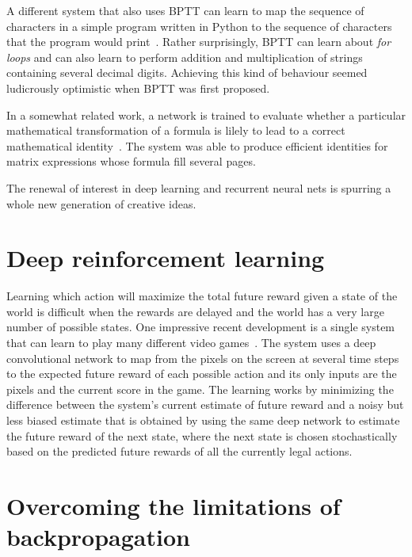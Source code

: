 \documentclass[10pts]{article}
\begin{document}
A different system that also uses BPTT can learn to map the sequence
of characters in a simple program written in Python to the sequence of
characters that the program would
print~\citep{Zaremba+Sutskever-arxiv2014}.  Rather surprisingly, BPTT
can learn about {\it for loops} and can also learn to perform addition
and multiplication of strings containing several decimal
digits. Achieving this kind of behaviour seemed ludicrously optimistic
when BPTT was first proposed.

In a somewhat related work, a network is trained to evaluate whether a
particular mathematical transformation of a formula is lilely to lead
to a correct mathematical identity~\cite{zaremba-nips-2014}. The
system was able to produce efficient identities for matrix expressions
whose formula fill several pages.

The renewal of interest in deep learning and recurrent neural nets is
spurring a whole new generation of creative ideas.
  
\section{Deep reinforcement learning}

Learning which action will maximize the total future reward given a state
of the world is difficult when the rewards are delayed and the world has a
very large number of possible states. One impressive recent development is
a single system that can learn to play many different video
games~\citep{Deepmind-atari-arxiv2013}. The system uses a deep convolutional network to
map from the pixels on the screen at several time steps to the
expected future reward of each possible action and its only inputs are the
pixels and the current score in the game. The learning works by minimizing
the difference between the system's current estimate of future reward and a
noisy but less biased estimate that is obtained by using the same deep
network to estimate the future reward of the next state, where the next
state is chosen stochastically based on the predicted future rewards of all
the currently legal actions.


\section{Overcoming the limitations of backpropagation}
\end{document}

